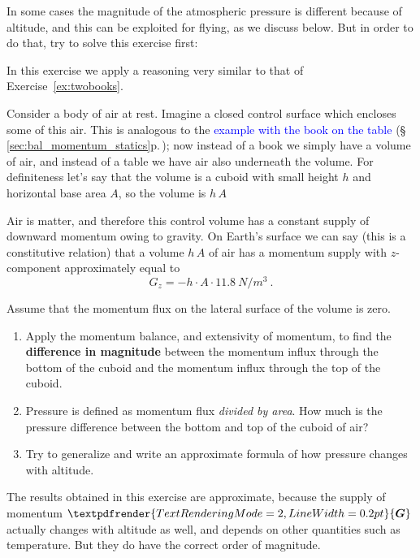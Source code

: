 \documentclass[a4paper,12pt,%
onecolumn,oneside,%
british%
]{memoir}
\renewcommand*{\bm}[1]{\textpdfrender{TextRenderingMode=2,LineWidth=0.2pt}{\boldsymbol{#1}}}
\renewcommand*{\|}[1][]{\nonscript\:#1\vert\nonscript\:\mathopen{}}
\newcommand*{\sect}{\S}%
\renewcommand*{\autoref}[3][\sect\,\ref]{\textcolor{blue}{#3} {\color{blue}\scriptsize(\faIcon[regular]{eye}\;#1{#2}\;p.\,\pageref{#2})}}
\newcommand*{\yG}{\bm{G}}
\begin{document}
In some cases the magnitude of the atmospheric pressure is different because of altitude, and this can be exploited for flying, as we discuss below. But in order to do that, try to solve this exercise first:
\begin{exercise}[label={ex:atmosphericpressure}]
  In this exercise we apply a reasoning very similar to that of Exercise~\ref{ex:twobooks}.

  Consider a body of air at rest. Imagine a closed control surface which encloses some of this air. This is analogous to the \autoref{sec:bal_momentum_statics}{example with the book on the table}; now instead of a book we simply have a volume of air, and instead of a table we have air also underneath the volume. For definiteness let's say that the volume is a cuboid with small height $h$ and horizontal base area $A$, so the volume is $h\,A$

  Air is matter, and therefore this control volume has a constant supply of downward momentum owing to gravity. On Earth's surface we can say (this is a constitutive relation) that a volume $h\,A$ of air has a momentum supply with $z$-component approximately equal to
  \begin{equation*}
    G_{z} = -h\cdot A \cdot \qty{11.8}{N/m^{3}}\ .
  \end{equation*}

  Assume that the momentum flux on the lateral surface of the volume is zero.
  \begin{enumerate}[exerc]
  \item Apply the momentum balance, and extensivity of momentum, to find the \textbf{difference in magnitude} between the momentum influx through the bottom of the cuboid and the momentum influx through the top of the cuboid.
    \item Pressure is defined as momentum flux \emph{divided by area}. How much is the pressure difference between the bottom and top of the cuboid of air?
    \item Try to generalize and write an approximate formula of how pressure changes with altitude.
    \end{enumerate}

    {\color{red}\footnotesize{}\enskip The results obtained in this exercise are approximate, because the supply of momentum $\yG$ actually changes with altitude as well, and depends on other quantities such as temperature. But they do have the correct order of magnitude.\par}
\end{exercise}
\end{document}
